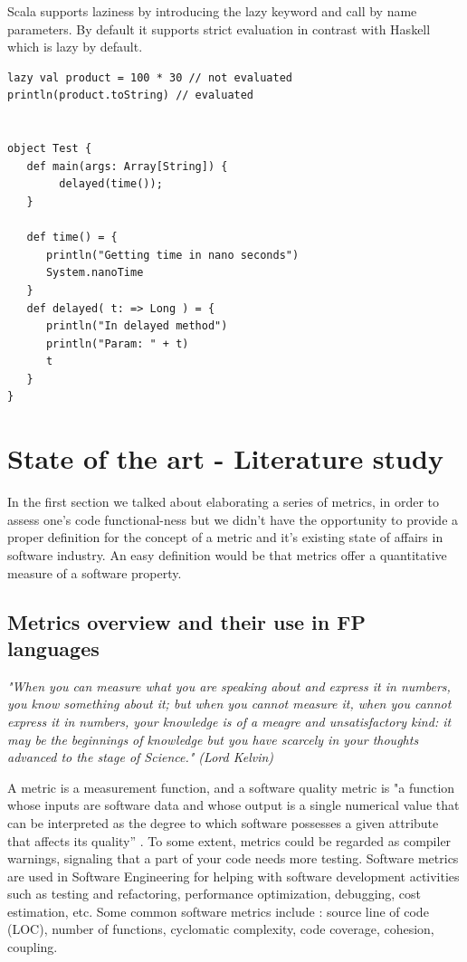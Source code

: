 \documentclass{article}
\begin{document}
Scala supports laziness by introducing the lazy keyword and call by name parameters. By default it supports strict evaluation in contrast with Haskell which is lazy by default.

\begin{lstlisting}
lazy val product = 100 * 30 // not evaluated
println(product.toString) // evaluated 


object Test {
   def main(args: Array[String]) {
        delayed(time());
   }

   def time() = {
      println("Getting time in nano seconds")
      System.nanoTime
   }
   def delayed( t: => Long ) = {
      println("In delayed method")
      println("Param: " + t)
      t
   }
}

\end{lstlisting}

\section {State of the art - Literature study}
In the first section we talked about elaborating a series of metrics, in order to assess one's code functional-ness but we didn't have the opportunity to provide a proper definition for the concept of a metric and it's existing state of affairs in software industry. An easy definition would be that metrics offer a quantitative measure of a software property. 

\subsection{Metrics overview and their use in FP languages}

\textit{"When you can measure what you are speaking about and express it in numbers, you know something about it; but when you cannot measure it, when you cannot express it in numbers, your knowledge is of a meagre and unsatisfactory kind: it may be the beginnings of knowledge but you have scarcely in your thoughts advanced to the stage of Science." (Lord Kelvin)}\par

A metric is a measurement function, and a software quality metric is "a function whose inputs are software data and whose output is a single numerical value that can be interpreted as the degree to which software possesses a given attribute that affects its quality'' \cite{Kaner04softwareengineering}. To some extent, metrics could be regarded as compiler warnings, signaling that a part of your code needs more testing. Software metrics are used in Software Engineering for helping with software development activities such as testing and refactoring, performance optimization, debugging, cost estimation, etc. Some common software metrics include : source line of code (LOC), number of functions, cyclomatic complexity, code coverage, cohesion, coupling. \par
\end{document}
